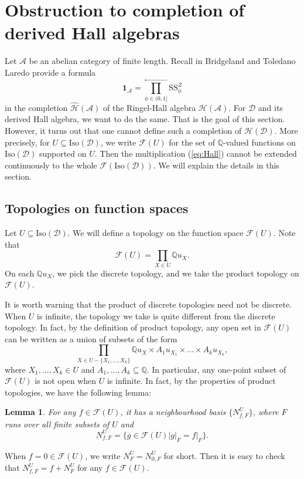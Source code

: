 \documentclass[a4paper,12pt]{amsart}
\numberwithin{equation}{section}
\newtheorem{lemma}[theorem]{Lemma}
\newcommand{\Ss}{\mathrm{SS}}
\newcommand{\Iso}{\mathrm{Iso}}
\newcommand{\1}{\mathbf{1}}
\begin{document}
\section{Obstruction to completion of derived Hall algebras}
Let $\mathcal{A}$ be an abelian category of finite length. Recall in \cite{BT2012} Bridgeland and Toledano Laredo provide a formula
\[\1_{\mathcal{A}}=\prod_{\phi\in(0,1]}^\leftarrow\Ss^Z_{\phi}\]
in the completion $\hat{\mathcal{H}}(\mathcal{A})$ of the Ringel-Hall algebra $\mathcal{H}(\mathcal{A})$. For $\mathcal{D}$ and its derived Hall algebra, we want to do the same. That is the goal of this section. However, it turns out that one cannot define such a completion of $\mathcal{H}(\mathcal{D})$. More precisely, for $U\subseteq\Iso(\mathcal{D})$, we write $\mathscr{F}(U)$ for the set of $\mathbb{Q}$-valued functions on $\Iso(\mathcal{D})$ supported on $U$. Then the multiplication (\ref{eq:Hall}) cannot be extended continuously to the whole $\mathscr{F}(\Iso(\mathcal{D}))$. We will explain the details in this section.

\subsection{Topologies on function spaces}
Let $U\subseteq\Iso(\mathcal{D})$. We will define a topology on the function space $\mathscr{F}(U)$. Note that
\[\mathscr{F}(U)=\prod_{X\in U}\mathbb{Q}u_X.\]
On each $\mathbb{Q}u_X$, we pick the discrete topology, and we take the product topology on $\mathscr{F}(U)$.

It is worth warning that the product of discrete topologies need not be discrete. When $U$ is infinite, the topology we take is quite different from the discrete topology. In fact, by the definition of product topology, any open set in $\mathscr{F}(U)$ can be written as a union of subsets of the form
\[\prod_{X\in U-\{X_1,\dots,X_k\}}\mathbb{Q}u_X\times A_1u_{X_1}\times\dots\times A_ku_{X_k},\]
where $X_1,\dots,X_k\in U$ and $A_1,\dots,A_k\subseteq\mathbb{Q}$. In particular, any one-point subset of $\mathscr{F}(U)$ is not open when $U$ is infinite. In fact, by the properties of product topologies, we have the following lemma:
\begin{lemma}\label{neighbourhood basis}
    For any $f\in\mathscr{F}(U)$, it has a neighbourhood basis $\{N_{f,F}^U\}$, where $F$ runs over all finite subsets of $U$ and
\[N_{f,F}^U=\{g\in\mathscr{F}(U)|g|_F=f|_F\}.\]
\end{lemma}
When $f=0\in\mathscr{F}(U)$, we write $N_F^U=N_{0,F}^U$ for short. Then it is easy to check that $N_{f,F}^U=f+N_F^U$ for any $f\in\mathscr{F}(U)$.
\end{document}

